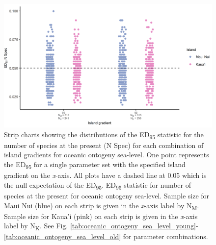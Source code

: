 \begin{figure}
    \centering
    \includegraphics{Island_gradient_ontogeny_sea_level_num_spec.png}
    \caption{Strip charts showing the distributions of the ED\textsubscript{95} statistic for the number of species at the present (N Spec) for each combination of island gradients for oceanic ontogeny sea-level. One point represents the ED\textsubscript{95} for a single parameter set with the specified island gradient on the \textit{x}-axis. All plots have a dashed line at 0.05 which is the null expectation of the ED\textsubscript{95}. ED\textsubscript{95} statistic for number of species at the present for oceanic ontogeny sea-level. Sample size for Maui Nui (blue) on each strip is given in the \textit{x}-axis label by N\textsubscript{M}. Sample size for Kaua'i (pink) on each strip is given in the \textit{x}-axis label by N\textsubscript{K}. See Fig. \ref{tab:oceanic_ontogeny_sea_level_young}-\ref{tab:oceanic_ontogeny_sea_level_old} for parameter combinations.}
    \label{fig:Island_gradient_ontogeny_sea_level_num_spec}
\end{figure}

